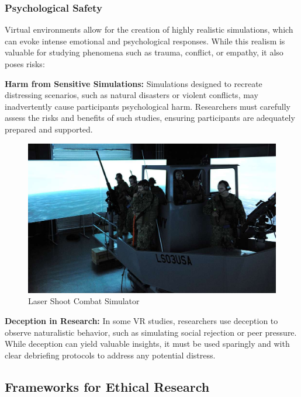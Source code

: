 \documentclass[
]{book}
\begin{document}
\subsubsection*{Psychological Safety}\label{psychological-safety}

Virtual environments allow for the creation of highly realistic simulations, which can evoke intense emotional and psychological responses. While this realism is valuable for studying phenomena such as trauma, conflict, or empathy, it also poses risks:

\textbf{Harm from Sensitive Simulations:} Simulations designed to recreate distressing scenarios, such as natural disasters or violent conflicts, may inadvertently cause participants psychological harm. Researchers must carefully assess the risks and benefits of such studies, ensuring participants are adequately prepared and supported.

\begin{figure}
\centering
\includegraphics[width=1\linewidth,height=\textheight,keepaspectratio]{images/simulation.jpg}
\caption{Laser Shoot Combat Simulator}
\end{figure}

\textbf{Deception in Research:} In some VR studies, researchers use deception to observe naturalistic behavior, such as simulating social rejection or peer pressure. While deception can yield valuable insights, it must be used sparingly and with clear debriefing protocols to address any potential distress.

\subsection*{Frameworks for Ethical Research}\label{frameworks-for-ethical-research}
\end{document}
